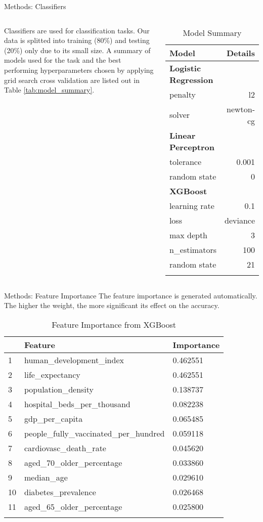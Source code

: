 \begin{frame}{Methods: Classifiers}
\begin{columns}
Classifiers are used for classification tasks. Our data is splitted into training (80\%) and testing (20\%) only due to its small size. A summary of models used for the task and the best performing hyperparameters chosen by applying grid search cross validation are listed out in Table \autoref{tab:model_summary}.
\begin{table}
	\caption{Model Summary}
	\centering
	\begin{tabular}{lr}
		\hline
		\textbf{Model} & \textbf{Details} \\
		\hline
		\textbf{Logistic Regression} & \\ 
		penalty & l2 \\
		solver & newton-cg \\
		\hline
		\textbf{Linear Perceptron} & \\
		tolerance & 0.001 \\
		random state & 0 \\
		\hline
		\textbf{XGBoost} & \\
		learning rate & 0.1\\
		loss & deviance \\
		max depth & 3 \\
		n\_estimators & 100 \\
		random state & 21 \\
		\hline
	\label{tab:model_summary}
	\end{tabular}
\end{table}
\end{columns}
\end{frame}

\begin{frame}{Methods: Feature Importance}
The feature importance is generated automatically. The higher the weight, the more significant its effect on the accuracy.
\begin{table}
	\caption{Feature Importance from XGBoost}
	\centering
	\begin{tabular}{lll}
		\hline
		& \textbf{Feature} & \textbf{Importance} \\
		\hline
		1& human\_development\_index & 0.462551 \\
		2& life\_expectancy& 0.462551\\
		3& population\_density& 0.138737\\
		4& hospital\_beds\_per\_thousand& 0.082238\\
		5& gdp\_per\_capita& 0.065485\\
		6& people\_fully\_vaccinated\_per\_hundred& 0.059118\\
		7& cardiovasc\_death\_rate& 0.045620\\
		8& aged\_70\_older\_percentage& 0.033860\\
		9& median\_age& 0.029610\\
		10& diabetes\_prevalence& 0.026468\\
		11& aged\_65\_older\_percentage& 0.025800\\
		\hline
	\label{tab:feature_importance}
	\end{tabular}
\end{table}
\end{frame}